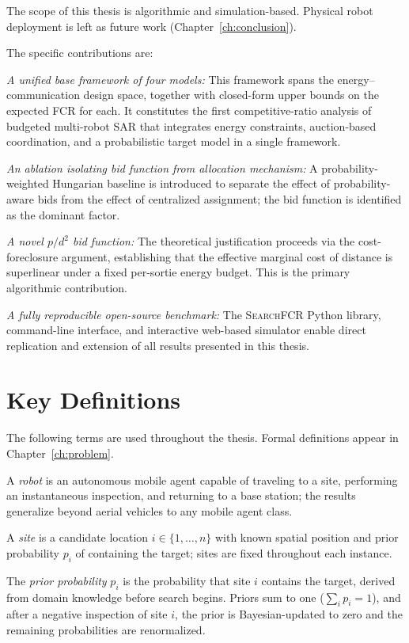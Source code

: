 \begin{doublespacing}
The scope of this thesis is algorithmic and simulation-based.
Physical robot deployment is left as future work
(Chapter~\ref{ch:conclusion}).

The specific contributions are:

\emph{A unified base framework of four models:}  This framework spans the
energy--communication design space, together with closed-form upper
bounds on the expected FCR for each.
It constitutes the first competitive-ratio analysis of budgeted
multi-robot SAR that integrates energy constraints, auction-based
coordination, and a probabilistic target model in a single framework.

\emph{An ablation isolating bid function from allocation mechanism:}  A
probability-weighted Hungarian baseline is introduced to separate the
effect of probability-aware bids from the effect of centralized
assignment; the bid function is identified as the dominant factor.

\emph{A novel $p/d^2$ bid function:}  The theoretical justification
proceeds via the cost-foreclosure argument, establishing that the
effective marginal cost of distance is superlinear under a fixed
per-sortie energy budget.
This is the primary algorithmic contribution.

\emph{A fully reproducible open-source benchmark:}  The
\textsc{SearchFCR} Python library, command-line interface, and
interactive web-based simulator enable direct replication and extension
of all results presented in this thesis.

\section{Key Definitions}

The following terms are used throughout the thesis.
Formal definitions appear in Chapter~\ref{ch:problem}.

A \emph{robot} is an autonomous mobile agent capable of traveling to a
site, performing an instantaneous inspection, and returning to a base
station; the results generalize beyond aerial vehicles to any mobile
agent class.

A \emph{site} is a candidate location $i \in \{1,\ldots,n\}$ with known
spatial position and prior probability $p_i$ of containing the target;
sites are fixed throughout each instance.

The \emph{prior probability} $p_i$ is the probability that site $i$
contains the target, derived from domain knowledge before search begins.
Priors sum to one ($\sum_i p_i = 1$), and after a negative inspection of
site $i$, the prior is Bayesian-updated to zero and the remaining
probabilities are renormalized.


\end{doublespacing}
